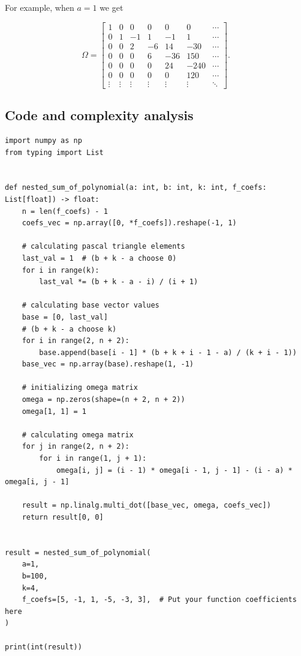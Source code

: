 \documentclass[12pt]{article}
\begin{document}
For example, when $a = 1$ we get

$$
    \Omega =
    \begin{bmatrix}
        1      & 0      & 0      & 0      & 0      & 0      & \cdots \\
        0      & 1      & -1     & 1      & -1     & 1      & \cdots \\
        0      & 0      & 2      & -6     & 14     & -30    & \cdots \\
        0      & 0      & 0      & 6      & -36    & 150    & \cdots \\
        0      & 0      & 0      & 0      & 24     & -240   & \cdots \\
        0      & 0      & 0      & 0      & 0      & 120    & \cdots \\
        \vdots & \vdots & \vdots & \vdots & \vdots & \vdots & \ddots
    \end{bmatrix}.
$$

\vspace{20px}

\subsection{Code and complexity analysis}

\begin{lstlisting}[style=Python]
import numpy as np
from typing import List


def nested_sum_of_polynomial(a: int, b: int, k: int, f_coefs: List[float]) -> float:
    n = len(f_coefs) - 1
    coefs_vec = np.array([0, *f_coefs]).reshape(-1, 1)

    # calculating pascal triangle elements
    last_val = 1  # (b + k - a choose 0)
    for i in range(k):
        last_val *= (b + k - a - i) / (i + 1)

    # calculating base vector values
    base = [0, last_val]
    # (b + k - a choose k)
    for i in range(2, n + 2):
        base.append(base[i - 1] * (b + k + i - 1 - a) / (k + i - 1))
    base_vec = np.array(base).reshape(1, -1)

    # initializing omega matrix
    omega = np.zeros(shape=(n + 2, n + 2))
    omega[1, 1] = 1

    # calculating omega matrix
    for j in range(2, n + 2):
        for i in range(1, j + 1):
            omega[i, j] = (i - 1) * omega[i - 1, j - 1] - (i - a) * omega[i, j - 1]

    result = np.linalg.multi_dot([base_vec, omega, coefs_vec])
    return result[0, 0]


result = nested_sum_of_polynomial(
    a=1,
    b=100,
    k=4,
    f_coefs=[5, -1, 1, -5, -3, 3],  # Put your function coefficients here
)

print(int(result))
    
\end{lstlisting}
\end{document}
